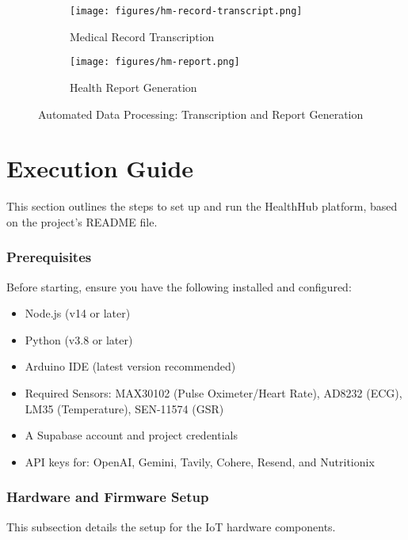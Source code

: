 \begin{figure}[H]
    \centering
    \begin{subfigure}{\textwidth}
        \centering
        \texttt{[image: figures/hm-record-transcript.png]}
        \caption{Medical Record Transcription}
        \label{fig:transcript_showcase}
    \end{subfigure}
    \vspace{1em} %
    \begin{subfigure}{\textwidth}
        \centering
        \texttt{[image: figures/hm-report.png]}
        \caption{Health Report Generation}
        \label{fig:report_showcase}
    \end{subfigure}
    \caption{Automated Data Processing: Transcription and Report Generation}
    \label{fig:data_processing_pair4}
\end{figure}

\section{Execution Guide}

This section outlines the steps to set up and run the HealthHub platform, based on the project's README file.

\subsubsection*{Prerequisites}
Before starting, ensure you have the following installed and configured:
\begin{itemize}
    \item Node.js (v14 or later)
    \item Python (v3.8 or later)
    \item Arduino IDE (latest version recommended)
    \item Required Sensors: MAX30102 (Pulse Oximeter/Heart Rate), AD8232 (ECG), LM35 (Temperature), SEN-11574 (GSR)
    \item A Supabase account and project credentials
    \item API keys for: OpenAI, Gemini, Tavily, Cohere, Resend, and Nutritionix
\end{itemize}

\subsubsection*{Hardware and Firmware Setup}
This subsection details the setup for the IoT hardware components.

